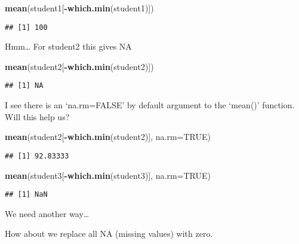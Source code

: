 \documentclass[
]{article}
\newenvironment{Shaded}{\begin{snugshade}}{\end{snugshade}}
\newcommand{\DataTypeTok}[1]{\textcolor[rgb]{0.13,0.29,0.53}{#1}}
\newcommand{\KeywordTok}[1]{\textcolor[rgb]{0.13,0.29,0.53}{\textbf{#1}}}
\newcommand{\NormalTok}[1]{#1}
\newcommand{\OperatorTok}[1]{\textcolor[rgb]{0.81,0.36,0.00}{\textbf{#1}}}
\newcommand{\OtherTok}[1]{\textcolor[rgb]{0.56,0.35,0.01}{#1}}
\begin{document}
\begin{Shaded}
\begin{Highlighting}[]
\KeywordTok{mean}\NormalTok{(student1[}\OperatorTok{-}\KeywordTok{which.min}\NormalTok{(student1)])}
\end{Highlighting}
\end{Shaded}

\begin{verbatim}
## [1] 100
\end{verbatim}

Hmm\ldots{} For student2 this gives NA

\begin{Shaded}
\begin{Highlighting}[]
\KeywordTok{mean}\NormalTok{(student2[}\OperatorTok{-}\KeywordTok{which.min}\NormalTok{(student2)])}
\end{Highlighting}
\end{Shaded}

\begin{verbatim}
## [1] NA
\end{verbatim}

I see there is an `na.rm=FALSE' by default argument to the `mean()'
function. Will this help us?

\begin{Shaded}
\begin{Highlighting}[]
\KeywordTok{mean}\NormalTok{(student2[}\OperatorTok{-}\KeywordTok{which.min}\NormalTok{(student2)], }\DataTypeTok{na.rm=}\OtherTok{TRUE}\NormalTok{)}
\end{Highlighting}
\end{Shaded}

\begin{verbatim}
## [1] 92.83333
\end{verbatim}

\begin{Shaded}
\begin{Highlighting}[]
\KeywordTok{mean}\NormalTok{(student3[}\OperatorTok{-}\KeywordTok{which.min}\NormalTok{(student3)], }\DataTypeTok{na.rm=}\OtherTok{TRUE}\NormalTok{)}
\end{Highlighting}
\end{Shaded}

\begin{verbatim}
## [1] NaN
\end{verbatim}

We need another way\ldots{}

How about we replace all NA (missing values) with zero.
\end{document}
